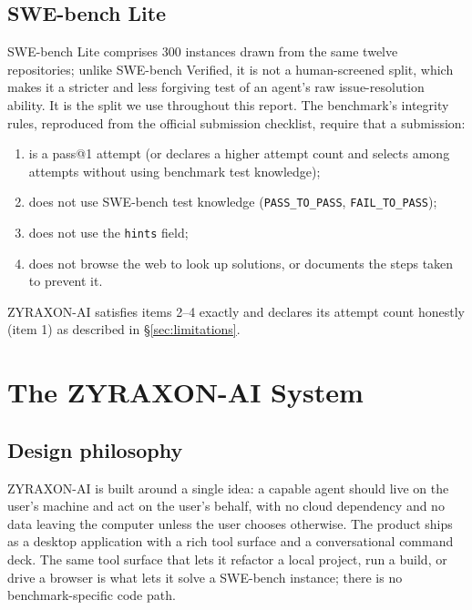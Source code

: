 \documentclass[11pt,a4paper]{article}
\begin{document}
\subsection{SWE-bench Lite}

SWE-bench Lite comprises 300 instances drawn from the same twelve repositories; unlike
SWE-bench Verified, it is not a human-screened split, which makes it a stricter and less
forgiving test of an agent's raw issue-resolution ability. It is the split we use
throughout this report. The benchmark's integrity rules, reproduced from the official
submission checklist, require that a submission:

\begin{enumerate}[leftmargin=1.4em]
  \item is a pass@1 attempt (or declares a higher attempt count and selects among
  attempts without using benchmark test knowledge);
  \item does not use SWE-bench test knowledge (\texttt{PASS\_TO\_PASS},
  \texttt{FAIL\_TO\_PASS});
  \item does not use the \texttt{hints} field;
  \item does not browse the web to look up solutions, or documents the steps taken to
  prevent it.
\end{enumerate}

ZYRAXON-AI satisfies items 2--4 exactly and declares its attempt count honestly
(item 1) as described in \S\ref{sec:limitations}.

\section{The ZYRAXON-AI System}
\label{sec:system}

\subsection{Design philosophy}

ZYRAXON-AI is built around a single idea: a capable agent should live on the user's
machine and act on the user's behalf, with no cloud dependency and no data leaving the
computer unless the user chooses otherwise. The product ships as a desktop application
with a rich tool surface and a conversational command deck. The same tool surface that
lets it refactor a local project, run a build, or drive a browser is what lets it solve a
SWE-bench instance; there is no benchmark-specific code path.
\end{document}
